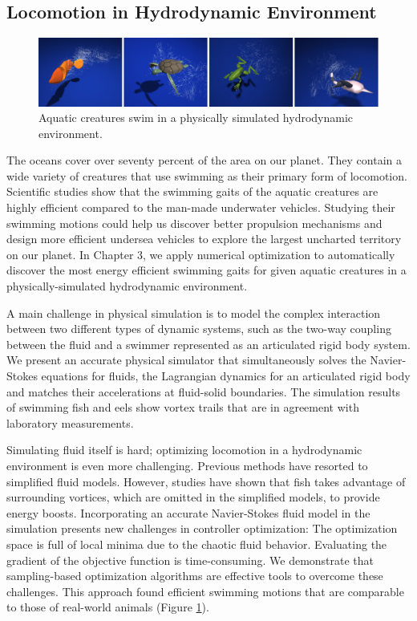 \subsection{Locomotion in Hydrodynamic Environment}


\begin{figure}[!h]
  \centering
    \includegraphics[width=\textwidth]{figures/teaserSwimming.eps}
  \caption{Aquatic creatures swim in a physically simulated hydrodynamic environment.}
  \label{fig:teaser1}
\end{figure}

The oceans cover over seventy percent of the area on our planet. They contain a wide variety of creatures that use swimming as their primary form of locomotion. Scientific studies show that the swimming gaits of the aquatic creatures are highly efficient compared to the man-made underwater vehicles. Studying their swimming motions could help us discover better propulsion mechanisms and design more efficient undersea vehicles to explore the largest uncharted territory on our planet. In Chapter 3, we apply numerical optimization to automatically discover the most energy efficient swimming gaits for given aquatic creatures in a physically-simulated hydrodynamic environment.

A main challenge in physical simulation is to model the complex interaction between two different types of dynamic systems, such as the two-way coupling between the fluid and a swimmer represented as an articulated rigid body system. We present an accurate physical simulator \cite{Tan:2011} that simultaneously solves the Navier-Stokes equations for fluids, the Lagrangian dynamics for an articulated rigid body and matches their accelerations at fluid-solid boundaries. The simulation results of swimming fish and eels show vortex trails that are in agreement with laboratory measurements.

Simulating fluid itself is hard; optimizing locomotion in a hydrodynamic environment is even more challenging. Previous methods have resorted to simplified fluid models. However, studies have shown that fish takes advantage of surrounding vortices, which are omitted in the simplified models, to provide energy boosts. Incorporating an accurate Navier-Stokes fluid model in the simulation presents new challenges in controller optimization: The optimization space is full of local minima due to the chaotic fluid behavior. Evaluating the gradient of the objective function is time-consuming. We demonstrate that sampling-based optimization algorithms are effective tools to overcome these challenges. This approach found efficient swimming motions that are comparable to those of real-world animals (Figure \ref{fig:teaser1}). 

